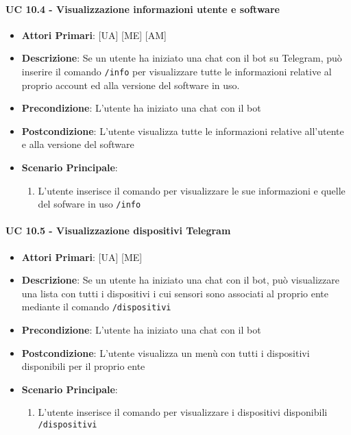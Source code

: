 			\paragraph{UC 10.4 - Visualizzazione informazioni utente e software}
			\begin{itemize}
				\item \textbf{Attori Primari}: [UA] [ME] [AM]
				\item \textbf{Descrizione}: Se un utente ha iniziato una chat con il bot su Telegram, può inserire il comando \verb!/info! per visualizzare tutte le informazioni relative al proprio account ed alla versione del software in uso.
				\item \textbf{Precondizione}: L'utente ha iniziato una chat con il bot
				\item \textbf{Postcondizione}: L'utente visualizza tutte le informazioni relative all'utente e alla versione del software
				\item \textbf{Scenario Principale}:
				\begin{enumerate}
					\item{L'utente inserisce il comando per visualizzare le sue informazioni e quelle del sofware in uso \verb!/info!}
				\end{enumerate}	
			\end{itemize}

			\paragraph{UC 10.5 - Visualizzazione dispositivi Telegram}
			\begin{itemize}
				\item \textbf{Attori Primari}: [UA] [ME]
				\item \textbf{Descrizione}: Se un utente ha iniziato una chat con il bot, può visualizzare una lista con tutti i dispositivi i cui sensori sono associati al proprio ente mediante il comando \verb!/dispositivi!
				\item \textbf{Precondizione}: L'utente ha iniziato una chat con il bot 
				\item \textbf{Postcondizione}: L'utente visualizza un menù con tutti i dispositivi disponibili per il proprio ente
				\item \textbf{Scenario Principale}:
				\begin{enumerate}
					\item{L'utente inserisce il comando per visualizzare i dispositivi disponibili \verb!/dispositivi!}
				\end{enumerate}	
			\end{itemize}

